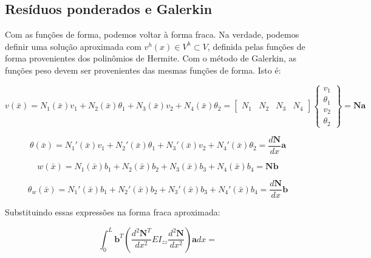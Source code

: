    \subsection{Resíduos ponderados e Galerkin}

        Com as funções de forma, podemos voltar à forma fraca. Na verdade, podemos definir uma solução aproximada com $v^h(x) \in V^h \subset V$, definida pelas funções de forma provenientes dos polinômios de Hermite. Com o método de Galerkin, as funções peso devem ser provenientes das mesmas funções de forma. Isto é:

        \begin{equation}
            v(\bar{x}) = N_1(\bar{x}) v_1 + N_2(\bar{x}) \theta_1 + N_3(\bar{x}) v_2 + N_4(\bar{x}) \theta_2 = 
            \begin{bmatrix}
                N_1 &
                N_2 &
                N_3 &
                N_4
            \end{bmatrix} 
            \begin{Bmatrix}
                v_1 \\
                \theta_1 \\
                v_2 \\
                \theta_2
            \end{Bmatrix}= 
            \mathbf{N} \mathbf{a}
        \end{equation}

        \begin{equation}
            \theta(\bar{x}) = N_1'(\bar{x}) v_1 + N_2'(\bar{x}) \theta_1 + N_3'(\bar{x}) v_2 + N_4'(\bar{x}) \theta_2 = 
            \frac{d\mathbf{N}}{dx} \mathbf{a}
        \end{equation}

        \begin{equation}
            w(\bar{x}) = N_1(\bar{x}) b_1 + N_2(\bar{x}) b_2 + N_3(\bar{x}) b_3 + N_4(\bar{x}) b_4 = 
            \mathbf{N} \mathbf{b}
        \end{equation}

        \begin{equation}
            \theta_w(\bar{x}) = N_1'(\bar{x}) b_1 + N_2'(\bar{x}) b_2 + N_3'(\bar{x}) b_3 + N_4'(\bar{x}) b_4 = 
            \frac{d\mathbf{N}}{dx} \mathbf{b}
        \end{equation}

        Substituindo essas expressões na forma fraca aproximada:

        
        \begin{equation*}
            \int_0^L \mathbf{b}^T \left(\frac{d^2\mathbf{N}^T}{dx^2} EI_{zz}\frac{d^2\mathbf{N}}{dx^2}\right)\mathbf{a} dx = 
        \end{equation*}

